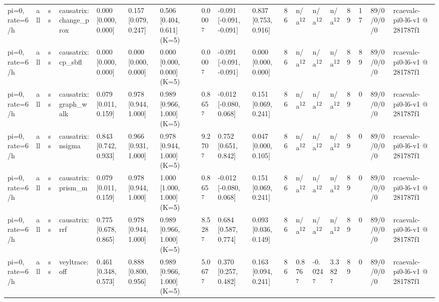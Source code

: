 \begin{table}[t]
\begin{tabular}{llllllllllllllllll}
pi=0, rate=6/h & all & ss & causatrix:change\_prox & 0.000 [0.000, 0.000] & 0.157 [0.079, 0.247] & 0.506 [0.404, 0.611] (K=5) & 0.000\textsuperscript{7} & -0.091 [-0.091, -0.091] & 0.837 [0.753, 0.916] & 86 & n/a\textsuperscript{12} & n/a\textsuperscript{12} & n/a\textsuperscript{12} & 89 & 17 & 89/0/0/0/0 & rcaevalc-pi0-l6-v1 @ 281787f1 \\
pi=0, rate=6/h & all & ss & causatrix:cp\_sbfl & 0.000 [0.000, 0.000] & 0.000 [0.000, 0.000] & 0.000 [0.000, 0.000] (K=5) & 0.000\textsuperscript{7} & -0.091 [-0.091, -0.091] & 0.000 [0.000, 0.000] & 86 & n/a\textsuperscript{12} & n/a\textsuperscript{12} & n/a\textsuperscript{12} & 89 & 89 & 89/0/0/0/0 & rcaevalc-pi0-l6-v1 @ 281787f1 \\
pi=0, rate=6/h & all & ss & causatrix:graph\_walk & 0.079 [0.011, 0.159] & 0.978 [0.944, 1.000] & 0.989 [0.966, 1.000] (K=5) & 0.865\textsuperscript{7} & -0.012 [-0.080, 0.068] & 0.151 [0.069, 0.241] & 86 & n/a\textsuperscript{12} & n/a\textsuperscript{12} & n/a\textsuperscript{12} & 89 & 0 & 89/0/0/0/0 & rcaevalc-pi0-l6-v1 @ 281787f1 \\
pi=0, rate=6/h & all & ss & causatrix:nsigma & 0.843 [0.742, 0.933] & 0.966 [0.931, 1.000] & 0.978 [0.944, 1.000] (K=5) & 9.270\textsuperscript{7} & 0.752 [0.651, 0.842] & 0.047 [0.000, 0.105] & 86 & n/a\textsuperscript{12} & n/a\textsuperscript{12} & n/a\textsuperscript{12} & 89 & 0 & 89/0/0/0/0 & rcaevalc-pi0-l6-v1 @ 281787f1 \\
pi=0, rate=6/h & all & ss & causatrix:prism\_m & 0.079 [0.011, 0.159] & 0.978 [0.944, 1.000] & 1.000 [1.000, 1.000] (K=5) & 0.865\textsuperscript{7} & -0.012 [-0.080, 0.068] & 0.151 [0.069, 0.241] & 86 & n/a\textsuperscript{12} & n/a\textsuperscript{12} & n/a\textsuperscript{12} & 89 & 0 & 89/0/0/0/0 & rcaevalc-pi0-l6-v1 @ 281787f1 \\
pi=0, rate=6/h & all & ss & causatrix:rrf & 0.775 [0.678, 0.865] & 0.978 [0.944, 1.000] & 0.989 [0.966, 1.000] (K=5) & 8.528\textsuperscript{7} & 0.684 [0.587, 0.774] & 0.093 [0.036, 0.149] & 86 & n/a\textsuperscript{12} & n/a\textsuperscript{12} & n/a\textsuperscript{12} & 89 & 0 & 89/0/0/0/0 & rcaevalc-pi0-l6-v1 @ 281787f1 \\
pi=0, rate=6/h & all & ss & veyltrace:off & 0.461 [0.348, 0.573] & 0.888 [0.800, 0.956] & 0.989 [0.966, 1.000] (K=5) & 5.067\textsuperscript{7} & 0.370 [0.257, 0.482] & 0.163 [0.094, 0.241] & 86 & 0.876\textsuperscript{7} & -0.024\textsuperscript{7} & 3.382\textsuperscript{7} & 89 & 0 & 89/0/0/0/0 & rcaevalc-pi0-l6-v1 @ 281787f1 \\

\end{tabular}
\end{table}
